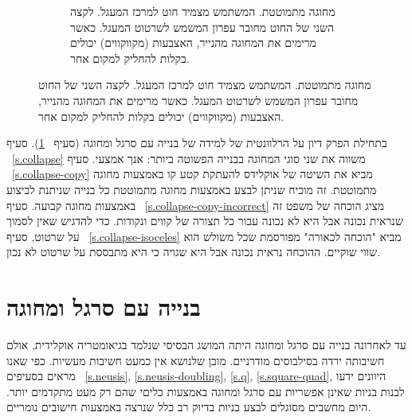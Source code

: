 \begin{figure}[tb]
\begin{center}
\begin{subfigure}[b]{.4\textwidth}
\caption{%
מחוגה מתמוטטת. המשתמש מצמיד חוט למרכז המעגל. לקצה השני של החוט מחובר עפרון המשמש לשרטוט המעגל. כאשר מרימים את המחוגה מהנייר, האצבעות (מקווקווים) יכולים בקלות להחליק למקום אחר.%
}\label{fig.collapsing-compass}
\end{subfigure}
\end{center}
\end{figure}

בתחילת הפרק דיון על הרלוונטית של למידה של בנייה עם סרגל ומחוגה (סעיף%
~\ref{s.relevance}).
סעיף%
~\ref{s.collapse} 
משווה את שני סוגי המחוגה בבנייה הפשוטה ביותר: אנך אמצעי. סעיף%
~\ref{s.collapse-copy}
מביא את השיטה של אוקלידס להעתקת קטע קו באמצעות מחוגה מתמוטטת. זה מוכיח שניתן לבצע באמצעות מחוגה מתמוטטת כל בנייה שניתנת לביצוע באמצעות מחוגה קבועה. סעיף%
~\ref{s.collapse-copy-incorrect} 
מציג הוכחה של משפט זה שנראית נכונה אבל היא לא נכונה עבור כל תצורה של קווים ונקודות. כדי להדגיש שאין לסמוך על שרטוט, סעיף%
~\ref{s.collapse-isoceles}
מביא "הוכחה לכאורה" מפורסמת שכל משולש הוא שווי שוקיים. ההוכחה נראית נכונה אבל היא שגויה כי היא מתבססת על שרטוט לא נכון.


\section{בנייה עם סרגל ומחוגה}\label{s.relevance}

עד לאחרונה בנייה עם סרגל ומחוגה היתה המושג הבסיסי שנלמד בגיאומטריה אוקלידית, אולם חשיבותה ירדה בסילבוסים מודרניים. מובן שלנושא אין כמעט חשיבות מעשיות. כפי שאנו מראים בסעיפים%
~\ref{s.neusis}, \ref{s.neusis-doubling}, \ref{s.q}, \ref{s.square-quad},
היוונים ידעו לבנות בניות שאינן אפשריות עם סרגל ומחוגה באמצעות כליםי שהם רק מעט מתקדמים יותר. היום מחשבים מסוגלים לבצע בניות בדיוק רב כלל שנרצה באמצעות חישובים נומריים.

